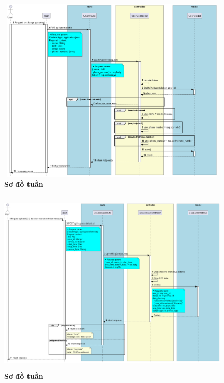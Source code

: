 \begin{figure}[H]
  \centering
  \includegraphics[width=16cm,height=9cm]{Images/server/sequence/server/updateUserInfo.png}
  \caption[Sơ đồ tuần tự ]{\bfseries \fontsize{12pt}{0pt}
  \selectfont Sơ đồ tuần }
  \label{hinh21} %
\end{figure}



\begin{figure}[H]
  \centering
  \includegraphics[width=16cm,height=9cm]{Images/server/sequence/server/uploadEcgData.png}
  \caption[Sơ đồ tuần tự ]{\bfseries \fontsize{12pt}{0pt}
  \selectfont Sơ đồ tuần }
  \label{hinh21} %
\end{figure}


